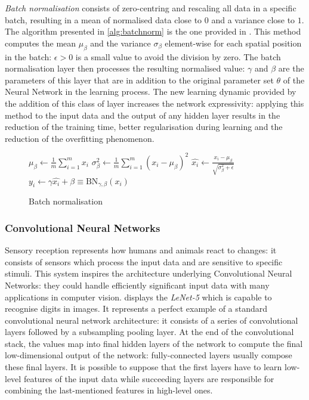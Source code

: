 \textit{Batch normalisation} consists of zero-centring and rescaling all data in a specific batch, resulting in a  mean of normalised data close to $0$ and a variance close to $1$. The algorithm presented in \vref{alg:batchnorm} is the one provided in \cite{ioffe2015batch}.
This method computes the mean $\mu_\beta$ and the variance $\sigma_\beta$  element-wise for each spatial position in the batch: $\epsilon > 0$ is a small value to avoid the division by zero.
The batch normalisation layer then processes the resulting normalised value: $\gamma$ and $\beta$ are the parameters of this layer that are in addition to the original parameter set $\theta$ of the Neural Network in the learning process.
The new learning dynamic provided by the addition of this class of layer increases the network expressivity: applying this method to the input data and the output of any hidden layer results in the reduction of the training time, better regularisation during learning and the reduction of the overfitting phenomenon.
\begin{figure}
	\begin{algorithm}[H]
		\SetAlgoLined
		\DontPrintSemicolon
		\LinesNumbered
		$\mu_\beta \leftarrow \frac{1}{m} \sum_{i=1}^{m} x_i $ 
		$\sigma_\beta^2 \leftarrow \frac{1}{m} \sum_{i=1}^{m} (x_i-\mu_\beta)^2 $ 
		$\hat{x_i} \leftarrow \frac{x_i - \mu_\beta}{\sqrt{\sigma^2_\beta + \epsilon}} $
		$y_i \leftarrow \gamma \hat{x_i} + \beta \equiv \text{BN}_{\gamma, \beta}(x_i)$
		\caption{Batch normalisation}
		\label{alg:batchnorm}
	\end{algorithm}
\end{figure}

\subsubsection{Convolutional Neural Networks}

Sensory reception represents how humans and animals react to changes: it consists of sensors which process the input data and are sensitive to specific stimuli. 
This system inspires the architecture underlying Convolutional Neural Networks: they could handle efficiently significant input data with many applications in computer vision.
 displays the \textit{LeNet-5} \cite{lecun1998gradient} which is capable to recognise digits in images. It represents a perfect example of a standard convolutional neural network architecture: it consists of a series of convolutional layers followed by a subsampling pooling layer.
At the end of the convolutional stack, the values map into final hidden layers of the network to compute the final low-dimensional output of the network: fully-connected layers usually compose these final layers.
It is possible to suppose that the first layers have to learn low-level features of the input data while succeeding layers are responsible for combining the last-mentioned features in high-level ones.

